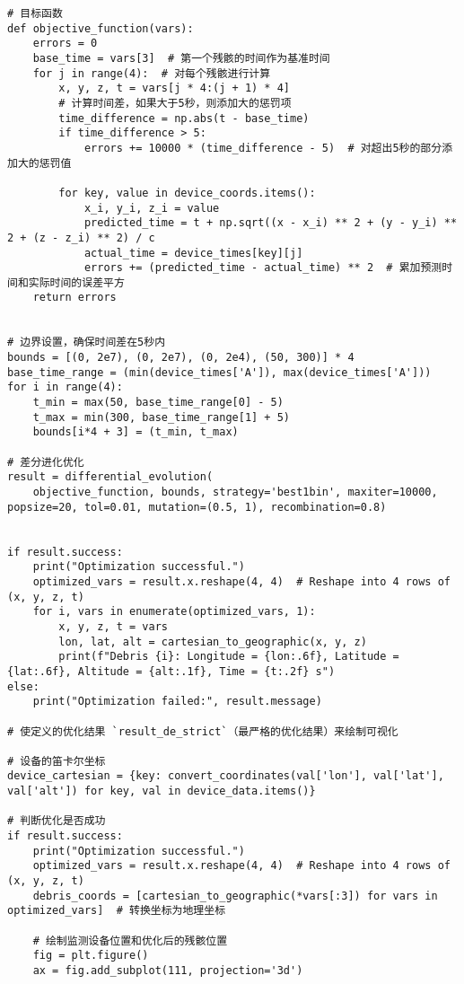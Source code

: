 \documentclass[withoutpreface,bwprint,12pt,a4paper]{cumcmthesis}
\begin{document}
\begin{appendices}
\begin{lstlisting}
# 目标函数
def objective_function(vars):
    errors = 0
    base_time = vars[3]  # 第一个残骸的时间作为基准时间
    for j in range(4):  # 对每个残骸进行计算
        x, y, z, t = vars[j * 4:(j + 1) * 4]
        # 计算时间差，如果大于5秒，则添加大的惩罚项
        time_difference = np.abs(t - base_time)
        if time_difference > 5:
            errors += 10000 * (time_difference - 5)  # 对超出5秒的部分添加大的惩罚值

        for key, value in device_coords.items():
            x_i, y_i, z_i = value
            predicted_time = t + np.sqrt((x - x_i) ** 2 + (y - y_i) ** 2 + (z - z_i) ** 2) / c
            actual_time = device_times[key][j]
            errors += (predicted_time - actual_time) ** 2  # 累加预测时间和实际时间的误差平方
    return errors


# 边界设置，确保时间差在5秒内
bounds = [(0, 2e7), (0, 2e7), (0, 2e4), (50, 300)] * 4
base_time_range = (min(device_times['A']), max(device_times['A']))
for i in range(4):
    t_min = max(50, base_time_range[0] - 5)
    t_max = min(300, base_time_range[1] + 5)
    bounds[i*4 + 3] = (t_min, t_max)

# 差分进化优化
result = differential_evolution(
    objective_function, bounds, strategy='best1bin', maxiter=10000, popsize=20, tol=0.01, mutation=(0.5, 1), recombination=0.8)


if result.success:
    print("Optimization successful.")
    optimized_vars = result.x.reshape(4, 4)  # Reshape into 4 rows of (x, y, z, t)
    for i, vars in enumerate(optimized_vars, 1):
        x, y, z, t = vars
        lon, lat, alt = cartesian_to_geographic(x, y, z)
        print(f"Debris {i}: Longitude = {lon:.6f}, Latitude = {lat:.6f}, Altitude = {alt:.1f}, Time = {t:.2f} s")
else:
    print("Optimization failed:", result.message)

# 使定义的优化结果 `result_de_strict`（最严格的优化结果）来绘制可视化

# 设备的笛卡尔坐标
device_cartesian = {key: convert_coordinates(val['lon'], val['lat'], val['alt']) for key, val in device_data.items()}

# 判断优化是否成功
if result.success:
    print("Optimization successful.")
    optimized_vars = result.x.reshape(4, 4)  # Reshape into 4 rows of (x, y, z, t)
    debris_coords = [cartesian_to_geographic(*vars[:3]) for vars in optimized_vars]  # 转换坐标为地理坐标

    # 绘制监测设备位置和优化后的残骸位置
    fig = plt.figure()
    ax = fig.add_subplot(111, projection='3d')


\end{lstlisting}
\end{appendices}
\end{document}
